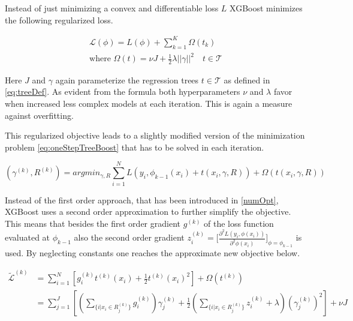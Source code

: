 \documentclass[
]{book}
\begin{document}
Instead of just minimizing a convex and differentiable loss \(L\) XGBoost minimizes the following regularized loss.\citep{xgboostPaper}

\begin{equation}
  \begin{split}
  \mathcal{L}(\phi) = L(\phi) + \sum_{k=1}^K \Omega(t_k) \\
  \text{where } \Omega(t) = \nu J + \frac{1}{2} \lambda ||\gamma||^2 \quad t \in \mathcal{T}
  \end{split}
  \label{eq:regLoss}
\end{equation}

Here \(J\) and \(\gamma\) again parameterize the regression trees \(t \in \mathcal{T}\) as defined in \eqref{eq:treeDef}. As evident from the formula both hyperparameters \(\nu\) and \(\lambda\) favor when increased less complex models at each iteration. This is again a measure against overfitting.

This regularized objective leads to a slightly modified version of the minimization problem \eqref{eq:oneStepTreeBoost} that has to be solved in each iteration.

\begin{equation}
  (\gamma^{(k)},R^{(k)}) = argmin_{\gamma,R} \sum_{i=1}^N L(y_i, \phi_{k-1}(x_i) + t(x_i,\gamma,R)) + \Omega(t(x_i,\gamma,R))
  \label{eq:oneStepXGBoost}
\end{equation}

Instead of the first order approach, that has been introduced in \ref{numOpt}, XGBoost uses a second order approximation to further simplify the objective. This means that besides the first order gradient \(g^{(k)}\) of the loss function evaluated at \(\phi_{k-1}\) also the second order gradient \(z^{(k)}_i = \bigg[\frac{\partial^2 L(y_i, \phi(x_i))}{\partial^2 \phi(x_i)}\bigg]_{\phi = \phi_{k-1}}\) is used. By neglecting constants one reaches the approximate new objective below.\citep{xgboostPaper}

\begin{equation}
\begin{split}
  \tilde{\mathcal{L}}^{(k)} & = \sum_{i=1}^N [g^{(k)}_i t^{(k)}(x_i) + \frac{1}{2} t^{(k)}(x_i)^2] + \Omega(t^{(k)}) \\
  & = \sum_{j=1}^J [(\sum_{\{i|x_i \in R^{(k)}_j\}} g^{(k)}_i) \gamma^{(k)}_j + \frac{1}{2} (\sum_{\{i|x_i \in R^{(k)}_j\}} z^{(k)}_i + \lambda) (\gamma^{(k)}_j)^2 ] + \nu J
\end{split}
\label{eq:oneappStepXGBoost}
\end{equation}
\end{document}
